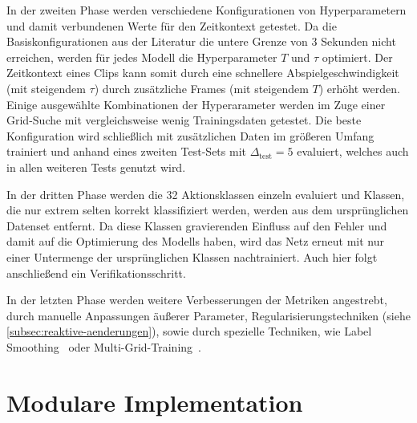 In der zweiten Phase werden verschiedene Konfigurationen von Hyperparametern und damit verbundenen Werte für den Zeitkontext getestet.
Da die Basiskonfigurationen aus der Literatur die untere Grenze von 3 Sekunden nicht erreichen, werden für jedes Modell die Hyperparameter $T$ und $\tau$ optimiert.
Der Zeitkontext eines Clips kann somit durch eine schnellere Abspielgeschwindigkeit (mit steigendem $\tau$) \bzw durch zusätzliche Frames (mit steigendem $T$) erhöht werden.
Einige ausgewählte Kombinationen der Hyperarameter werden im Zuge einer Grid-Suche mit vergleichsweise wenig Trainingsdaten getestet.
Die beste Konfiguration wird schließlich mit zusätzlichen Daten im größeren Umfang trainiert und anhand eines zweiten Test-Sets mit $\Delta_\text{test}=5$ evaluiert, welches auch in allen weiteren Tests genutzt wird.

In der dritten Phase werden die 32 Aktionsklassen einzeln evaluiert und Klassen, die nur extrem selten korrekt klassifiziert werden, werden aus dem ursprünglichen Datenset entfernt.
Da diese Klassen gravierenden Einfluss auf den Fehler und damit auf die Optimierung des Modells haben, wird das Netz erneut mit nur einer Untermenge der ursprünglichen Klassen nachtrainiert.
Auch hier folgt anschließend ein Verifikationsschritt.

In der letzten Phase werden weitere Verbesserungen der Metriken angestrebt, durch manuelle Anpassungen äußerer Parameter, Regularisierungstechniken (siehe \autoref{subsec:reaktive-aenderungen}), sowie durch spezielle Techniken, wie Label Smoothing~\cite{Szegedy16, Mueller20} oder Multi-Grid-Training~\cite{Wu20}.




\section{Modulare Implementation}
\label{sec:konzeptuelle-umsetzung}

